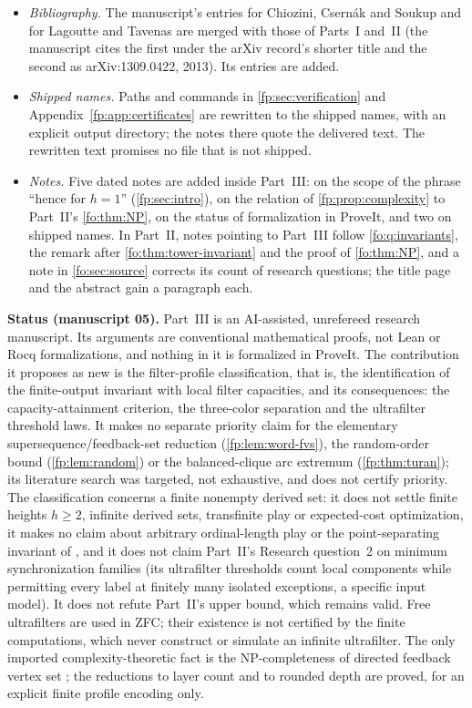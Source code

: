 \documentclass[11pt,letterpaper]{article}
\numberwithin{equation}{section}
\theoremstyle{definition}
\theoremstyle{remark}
\theoremstyle{definition}
\begin{document}
\begin{itemize}
is quoted above.
\item \emph{Bibliography.} The manuscript's entries for Chiozini, Csern\'ak
and Soukup \cite{CCS} and for Lagoutte and Tavenas \cite{LT} are merged with
those of Parts~I and~II (the manuscript cites the first under the arXiv
record's shorter title and the second as arXiv:1309.0422, 2013). Its
entries \cite{AGJS,AFH,GMM} are added.
\item \emph{Shipped names.} Paths and commands in
\cref{fp:sec:verification} and Appendix~\ref{fp:app:certificates} are
rewritten to the shipped names, with an explicit output directory; the
notes there quote the delivered text. The rewritten text promises no file
that is not shipped.
\item \emph{Notes.} Five dated notes are added inside Part~III: on the scope
of the phrase ``hence for $h=1$'' (\cref{fp:sec:intro}), on the relation of
\cref{fp:prop:complexity} to Part~II's \cref{fo:thm:NP}, on the status of
formalization in ProveIt, and two on shipped names. In Part~II, notes
pointing to Part~III follow \cref{fo:q:invariants}, the remark after
\cref{fo:thm:tower-invariant} and the proof of \cref{fo:thm:NP}, and a note in
\cref{fo:sec:source} corrects its count of research questions; the title
page and the abstract gain a paragraph each.
\end{itemize}

\begin{resultbox}
\textbf{Status (manuscript 05).} Part~III is an AI-assisted, unrefereed
research manuscript. Its arguments are conventional mathematical proofs, not
Lean or Rocq formalizations, and nothing in it is formalized in ProveIt. The
contribution it proposes as new is the filter-profile classification, that
is, the identification of the finite-output invariant with local filter
capacities, and its consequences: the capacity-attainment criterion, the
three-color separation and the ultrafilter threshold laws. It makes no
separate priority claim for the elementary supersequence/feedback-set
reduction (\cref{fp:lem:word-fvs}), the random-order bound
(\cref{fp:lem:random}) or the balanced-clique arc extremum
(\cref{fp:thm:turan}); its literature search was targeted, not exhaustive,
and does not certify priority. The classification concerns a finite
nonempty derived set: it does not settle finite heights $h\ge2$, infinite
derived sets, transfinite play or expected-cost optimization, it makes no
claim about arbitrary ordinal-length play or the point-separating invariant
of \cite{CCS}, and it does not claim Part~II's Research question~2 on
minimum synchronization families (its ultrafilter thresholds count local
components while permitting every label at finitely many isolated
exceptions, a specific input model). It does not refute Part~II's upper
bound, which remains valid. Free ultrafilters are used in ZFC; their
existence is not certified by the finite computations, which never construct
or simulate an infinite ultrafilter. The only imported complexity-theoretic
fact is the NP-completeness of directed feedback vertex set \cite{GMM}; the
reductions to layer count and to rounded depth are proved, for an explicit
finite profile encoding only.
\end{resultbox}
\end{document}
